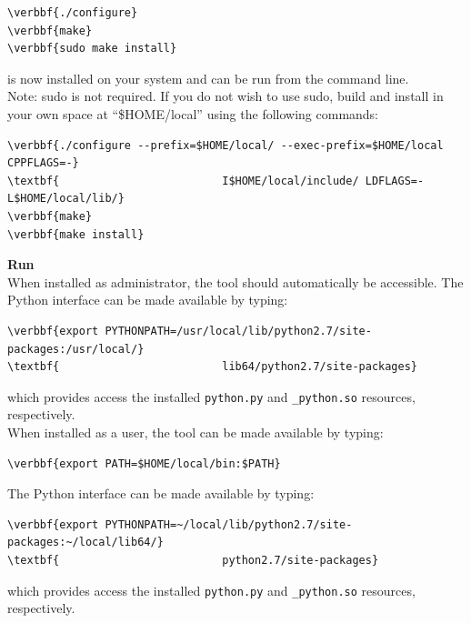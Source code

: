 \documentclass[11pt,fleqn]{article} %
\begin{document}
\begin{Verbatim}[commandchars=\\\{\}]
\verbbf{./configure}
\verbbf{make}
\verbbf{sudo make install}
\end{Verbatim}
\hdb is now installed on your system and can be run from the command line. \\

Note: sudo is not required. If you do not wish to use sudo,  build and install \hdb in your own space at ``\$HOME/local'' using the following commands:
\begin{Verbatim}[commandchars=\\\{\}]
\verbbf{./configure --prefix=$HOME/local/ --exec-prefix=$HOME/local CPPFLAGS=-}
\textbf{                         I$HOME/local/include/ LDFLAGS=-L$HOME/local/lib/}
\verbbf{make}
\verbbf{make install}
\end{Verbatim}

\textbf{Run \hdb}\\
When installed as administrator, the \hdb tool should automatically be accessible. The \hdb Python interface can be made available by typing:
\begin{Verbatim}[commandchars=\\\{\}]
\verbbf{export PYTHONPATH=/usr/local/lib/python2.7/site-packages:/usr/local/}
\textbf{                         lib64/python2.7/site-packages}
\end{Verbatim}

which provides access the installed \verb+python.py+ and \verb+_python.so+ resources, respectively.\\

When installed as a user, the \hdb tool can be made available by typing:
\begin{Verbatim}[commandchars=\\\{\}]
\verbbf{export PATH=$HOME/local/bin:$PATH}
\end{Verbatim}

The \hdb Python interface can be made available by typing:
\begin{Verbatim}[commandchars=\\\{\}]
\verbbf{export PYTHONPATH=~/local/lib/python2.7/site-packages:~/local/lib64/}
\textbf{                         python2.7/site-packages}
\end{Verbatim}

which provides access the installed \verb+python.py+ and \verb+_python.so+ resources, respectively.\\
\end{document}

